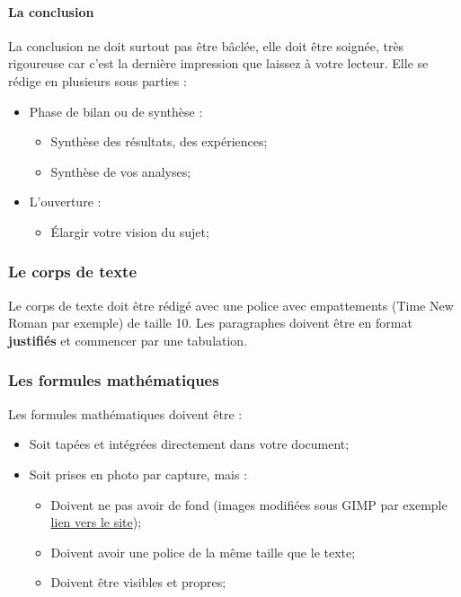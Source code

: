 \documentclass[11pt]{article}
\providecommand{\tightlist}{%
      \setlength{\itemsep}{0pt}\setlength{\parskip}{0pt}}
\begin{document}
\paragraph{La conclusion}\label{la-conclusion}

La conclusion ne doit surtout pas être bâclée, elle doit être soignée,
très rigoureuse car c'est la dernière impression que laissez à votre
lecteur. Elle se rédige en plusieurs sous parties :

\begin{itemize}
\item
  Phase de bilan ou de synthèse :

  \begin{itemize}
  \tightlist
  \item
    Synthèse des résultats, des expériences;
  \item
    Synthèse de vos analyses;
  \end{itemize}
\item
  L'ouverture :

  \begin{itemize}
  \tightlist
  \item
    Élargir votre vision du sujet;
  \end{itemize}
\end{itemize}

    \subsubsection{Le corps de texte}\label{le-corps-de-texte}

Le corps de texte doit être rédigé avec une police avec empattements
(Time New Roman par exemple) de taille 10. Les paragraphes doivent être
en format \textbf{justifiés} et commencer par une tabulation.

    \subsubsection{Les formules
mathématiques}\label{les-formules-mathuxe9matiques}

Les formules mathématiques doivent être :

\begin{itemize}
\tightlist
\item
  Soit tapées et intégrées directement dans votre document;
\item
  Soit prises en photo par capture, mais :

  \begin{itemize}
  \tightlist
  \item
    Doivent ne pas avoir de fond (images modifiées sous GIMP par exemple
    \href{https://www.gimp.org/}{lien vers le site});
  \item
    Doivent avoir une police de la même taille que le texte;
  \item
    Doivent être visibles et propres;
  \end{itemize}
\end{itemize}
\end{document}
